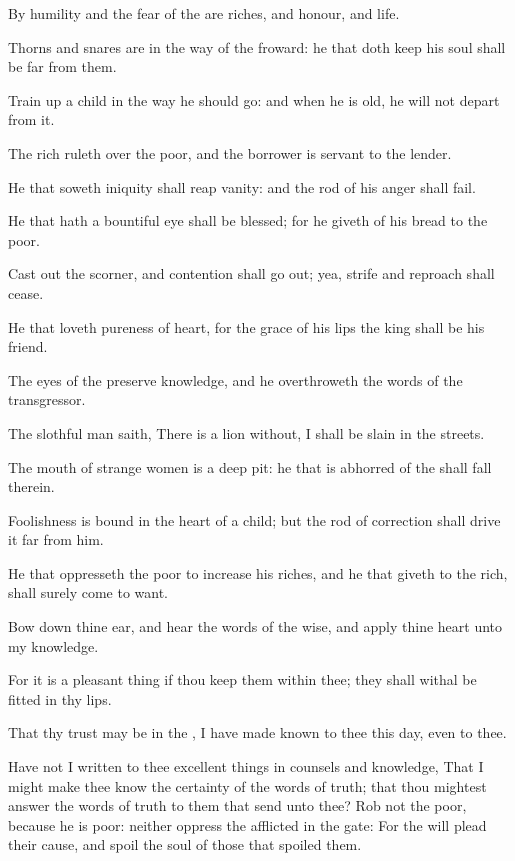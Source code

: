 \verse By humility and the fear of the \LORD are riches, and honour, and life.

\verse Thorns and snares are in the way of the froward: he that doth keep his soul shall be far from them.

\verse Train up a child in the way he should go: and when he is old, he will not depart from it.

\verse The rich ruleth over the poor, and the borrower is servant to the lender.

\verse He that soweth iniquity shall reap vanity: and the rod of his anger shall fail.

\verse He that hath a bountiful eye shall be blessed; for he giveth of his bread to the poor.

\verse Cast out the scorner, and contention shall go out; yea, strife and reproach shall cease.

\verse He that loveth pureness of heart, for the grace of his lips the king shall be his friend.

\verse The eyes of the \LORD preserve knowledge, and he overthroweth the words of the transgressor.

\verse The slothful man saith, There is a lion without, I shall be slain in the streets.

\verse The mouth of strange women is a deep pit: he that is abhorred of the \LORD shall fall therein.

\verse Foolishness is bound in the heart of a child; but the rod of correction shall drive it far from him.

\verse He that oppresseth the poor to increase his riches, and he that giveth to the rich, shall surely come to want.

\verse Bow down thine ear, and hear the words of the wise, and apply thine heart unto my knowledge.

\verse For it is a pleasant thing if thou keep them within thee; they shall withal be fitted in thy lips.

\verse That thy trust may be in the \LORD, I have made known to thee this day, even to thee.

\verse Have not I written to thee excellent things in counsels and knowledge, \verse That I might make thee know the certainty of the words of truth; that thou mightest answer the words of truth to them that send unto thee?  \verse Rob not the poor, because he is poor: neither oppress the afflicted in the gate: \verse For the \LORD will plead their cause, and spoil the soul of those that spoiled them.

